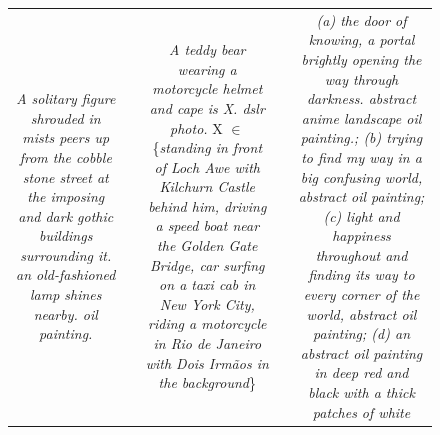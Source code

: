 \begin{figure}[ht!]
\begin{adjustwidth}{-0.8in}{-0.5in}
\begin{tabular}{cccccccccccccccccccc}
\multicolumn{6}{p{\thirdcolwidth\textwidth}}{\textit{\tiny A solitary figure shrouded in mists peers up from the cobble stone street at the imposing and dark gothic buildings surrounding it. an old-fashioned lamp shines nearby. oil painting.}} && 
\multicolumn{6}{p{\thirdcolwidth\textwidth}}{{\tiny \textit{A teddy bear wearing a motorcycle helmet and cape is X. dslr photo.} X $\in$ \{\textit{standing in front of Loch Awe with Kilchurn Castle behind him, driving a speed boat near the Golden Gate Bridge, car surfing on a taxi cab in New York City, riding a motorcycle in Rio de Janeiro with Dois Irmãos in the background}\}}} && 
\multicolumn{6}{p{\thirdcolwidth\textwidth}}{{\tiny \textit{(a) the door of knowing, a portal brightly opening the way through darkness. abstract anime landscape oil painting.; (b) trying to find my way in a big confusing world, abstract oil painting; (c) light and happiness throughout and finding its way to every corner of the world, abstract oil painting; (d) an abstract oil painting in deep red and black with a thick patches of white}}} \\


\end{tabular}
\end{adjustwidth}
\end{figure}

